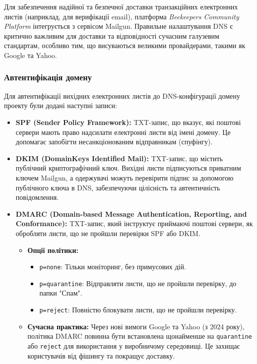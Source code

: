 Для забезпечення надійної та безпечної доставки транзакційних електронних листів (наприклад, для верифікації email), платформа \textit{Beekeepers Community Platform} інтегрується з сервісом Mailgun. Правильне налаштування DNS є критично важливим для доставки та відповідності сучасним галузевим стандартам, особливо тим, що висуваються великими провайдерами, такими як Google та Yahoo.

\subsubsection{Автентифікація домену}

Для автентифікації вихідних електронних листів до DNS-конфігурації домену проекту були додані наступні записи:

\begin{itemize}
    \item \textbf{SPF (Sender Policy Framework):} TXT-запис, що вказує, які поштові сервери мають право надсилати електронні листи від імені домену. Це допомагає запобігти несанкціонованим відправникам (спуфінгу).
    \item \textbf{DKIM (DomainKeys Identified Mail):} TXT-запис, що містить публічний криптографічний ключ. Вихідні листи підписуються приватним ключем Mailgun, а одержувачі можуть перевірити підпис за допомогою публічного ключа в DNS, забезпечуючи цілісність та автентичність повідомлення.
    \item \textbf{DMARC (Domain-based Message Authentication, Reporting, and Conformance):} TXT-запис, який інструктує приймаючі поштові сервери, як обробляти листи, що не пройшли перевірки SPF або DKIM.
        \begin{itemize}
            \item \textbf{Опції політики:}
                \begin{itemize}
                    \item \texttt{p=none}: Тільки моніторинг, без примусових дій.
                    \item \texttt{p=quarantine}: Відправляти листи, що не пройшли перевірку, до папки "Спам".
                    \item \texttt{p=reject}: Повністю блокувати листи, що не пройшли перевірку.
                \end{itemize}
            \item \textbf{Сучасна практика:} Через нові вимоги Google та Yahoo (з 2024 року), політика DMARC повинна бути встановлена щонайменше на \texttt{quarantine} або \texttt{reject} для використання у виробничому середовищі. Це захищає користувачів від фішингу та покращує доставку.
        \end{itemize}
\end{itemize}

